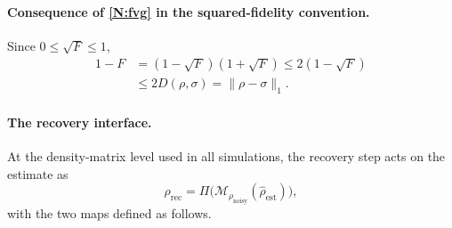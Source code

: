 \documentclass[pra,twocolumn,superscriptaddress,longbibliography,floatfix,nofootinbib]{revtex4-2}
\newcommand{\rhon}{\rho_\mathrm{noisy}}
\newcommand{\rhor}{\rho_\mathrm{rec}}
\newcommand{\rhoe}{\hat{\rho}_\mathrm{est}}
\begin{document}
\paragraph{Consequence of \ref{N:fvg} in the squared-fidelity convention.}
Since $0 \leq \sqrt F \leq 1$,
\begin{equation}
\begin{split}
1 - F &= (1 - \sqrt F)(1 + \sqrt F) \leq 2(1 - \sqrt F) \\
      &\leq 2D(\rho,\sigma) = \|\rho - \sigma\|_1 .
\end{split}
\label{eq:fvg_sq}
\end{equation}

\paragraph{The recovery interface.}
At the density-matrix level used in all simulations, the recovery step acts on the estimate as
\begin{equation}
\rhor = \Pi\bigl(\mathcal{M}_{\rhon}(\rhoe)\bigr),
\label{eq:recovery_structure}
\end{equation}
with the two maps defined as follows.
\end{document}
